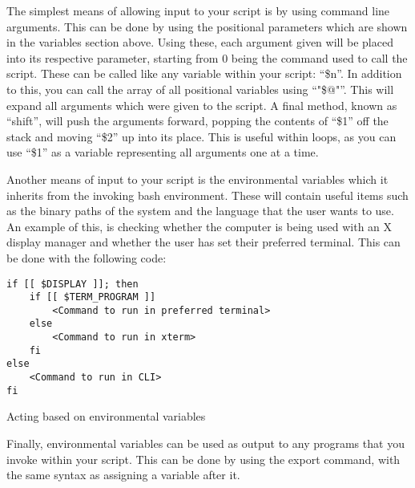 			The simplest means of allowing input to your script is by using command line arguments.
			This can be done by using the positional parameters which are shown in the variables section above.
			Using these, each argument given will be placed into its respective parameter, starting from 0 being the command used to call the script.
			These can be called like any variable within your script: ``\$n''.
			In addition to this, you can call the array of all positional variables using ``"\$@"''.
			This will expand all arguments which were given to the script.
			A final method, known as ``shift'', will push the arguments forward, popping the contents of ``\$1'' off the stack and moving ``\$2'' up into its place.
			This is useful within loops, as you can use ``\$1'' as a variable representing all arguments one at a time.

			Another means of input to your script is the environmental variables which it inherits from the invoking bash environment.
			These will contain useful items such as the binary paths of the system and the language that the user wants to use.
			An example of this, is checking whether the computer is being used with an X display manager and whether the user has set their preferred terminal.
			This can be done with the following code:
			\begin{code}
			\begin{verbatim}
if [[ $DISPLAY ]]; then
	if [[ $TERM_PROGRAM ]]
		<Command to run in preferred terminal>
	else
		<Command to run in xterm>
	fi
else
	<Command to run in CLI>
fi
			\end{verbatim}
			\label{code:checkingEnvironmentalVariables}
			\caption{Acting based on environmental variables}
			\end{code}
			Finally, environmental variables can be used as output to any programs that you invoke within your script.
			This can be done by using the export command, with the same syntax as assigning a variable after it.

